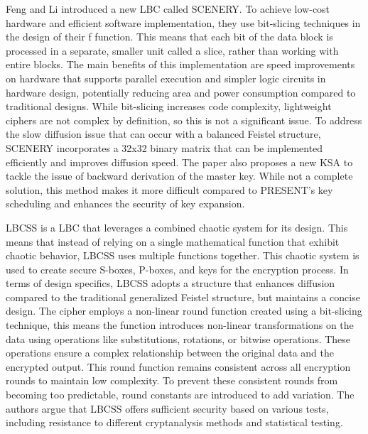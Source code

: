 \documentclass[conference]{IEEEtran}
\begin{document}
Feng and Li introduced a new LBC called SCENERY. To achieve low-cost hardware and efficient software implementation, they use bit-slicing techniques in the design of their f function. This means that each bit of the data block is processed in a separate, smaller unit called a slice, rather than working with entire blocks. The main benefits of this implementation are speed improvements on hardware that supports parallel execution and simpler logic circuits in hardware design, potentially reducing area and power consumption compared to traditional designs. While bit-slicing increases code complexity, lightweight ciphers are not complex by definition, so this is not a significant issue.
To address the slow diffusion issue that can occur with a balanced Feistel structure, SCENERY incorporates a 32x32 binary matrix that can be implemented efficiently and improves diffusion speed. The paper also proposes a new KSA to tackle the issue of backward derivation of the master key. While not a complete solution, this method makes it more difficult compared to PRESENT's key scheduling\cite{PRESENT} and enhances the security of key expansion.\cite{SCENERY}


LBCSS is a LBC that leverages a combined chaotic system for its design. This means that instead of relying on a single mathematical function that exhibit chaotic behavior, LBCSS uses multiple functions together. This chaotic system is used to create secure S-boxes, P-boxes, and keys for the encryption process. In terms of design specifics, LBCSS adopts a structure that enhances diffusion compared to the traditional generalized Feistel structure, but maintains a concise design. The cipher employs a non-linear round function created using a bit-slicing technique, this means the function introduces non-linear transformations on the data using operations like substitutions, rotations, or bitwise operations. These operations ensure a complex relationship between the original data and the encrypted output. This round function remains consistent across all encryption rounds to maintain low complexity. To prevent these consistent rounds from becoming too predictable, round constants are introduced to add variation. The authors argue that LBCSS offers sufficient security based on various tests, including resistance to different cryptanalysis methods and statistical testing.\cite{LBCCS}
\end{document}
